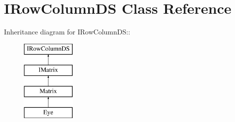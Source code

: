 \hypertarget{classIRowColumnDS}{
\section{IRowColumnDS Class Reference}
\label{classIRowColumnDS}
}
Inheritance diagram for IRowColumnDS::\begin{figure}[H]
\begin{center}
\leavevmode
\includegraphics[height=4cm]{classIRowColumnDS}
\end{center}
\end{figure}
